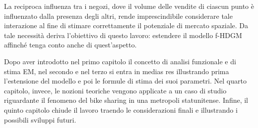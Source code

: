 \par La reciproca influenza tra i negozi, dove il volume delle vendite di ciascun punto è influenzato dalla presenza degli altri, rende imprescindibile considerare tale interazione al fine di stimare correttamente il potenziale di mercato spaziale. Da tale necessità deriva l'obiettivo di questo lavoro: estendere il modello f-HDGM affinché tenga conto anche di quest'aspetto.
\par Dopo aver introdotto nel primo capitolo il concetto di analisi funzionale e di stima EM, nel secondo e nel terzo si entra in medias res illustrando prima l'estensione del modello e poi le formule di stima dei suoi parametri. Nel quarto capitolo, invece, le nozioni teoriche vengono applicate a un caso di studio riguardante il fenomeno del bike sharing in una metropoli statunitense. Infine, il quinto capitolo chiude il lavoro traendo le considerazioni finali e illustrando i possibili sviluppi futuri. 